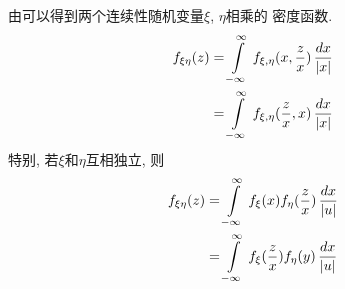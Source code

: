 \begin{multiplication_of_two_random_var}
    由可以得到两个连续性随机变量\(\xi\), \(\eta\)相乘的
    密度函数.
    \begin{align}
        f_{\xi\eta}(z) &= \int\limits_{-\infty}^{\infty}\,f_{\xi, \eta}(x, {z\over x})\,{dx\over |x|}\cr
                    &= \int\limits_{-\infty}^{\infty}\,f_{\xi, \eta}({z\over x}, x)\,{dx\over |x|}
    \end{align}
    特别, 若\(\xi\)和\(\eta\)互相独立, 则
    \begin{align}
        f_{\xi\eta}(z) &= \int\limits_{-\infty}^{\infty}\,f_{\xi}(x)f_{\eta}({z\over x})\,{dx\over |u|}\cr
        &= \int\limits_{-\infty}^{\infty}\,f_{\xi}({z\over x})f_{\eta}(y)\,{dx\over |u|}
    \end{align}
\end{multiplication_of_two_random_var}